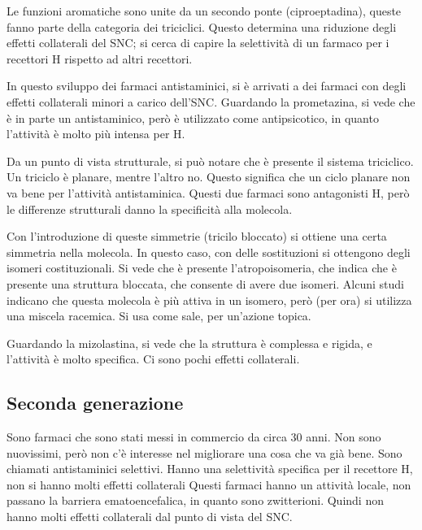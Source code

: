 
Le funzioni aromatiche sono unite da un secondo ponte (ciproeptadina),
queste fanno parte della categoria dei triciclici.
Questo determina una riduzione degli effetti collaterali del SNC; si
cerca di capire la selettività di un farmaco per i recettori H rispetto
ad altri recettori.


In questo sviluppo dei farmaci antistaminici, si è arrivati a dei
farmaci con degli effetti collaterali minori a carico dell'SNC.
Guardando la prometazina, si vede che è in parte un antistaminico, però
è utilizzato come antipsicotico, in quanto l'attività è molto più
intensa per H.

Da un punto di vista strutturale, si può notare che è presente il
sistema triciclico. Un triciclo è planare, mentre l'altro no.
Questo significa che un ciclo planare non va bene per l'attività
antistaminica.
Questi due farmaci sono antagonisti H, però le differenze strutturali
danno la specificità alla molecola.


Con l'introduzione di queste simmetrie (tricilo bloccato) si ottiene una
certa simmetria nella molecola. In questo caso, con delle sostituzioni
si ottengono degli isomeri costituzionali.
Si vede che è presente l'atropoisomeria, che indica che è presente una
struttura bloccata, che consente di avere due isomeri.
Alcuni studi indicano che questa molecola è più attiva in un isomero,
però (per ora) si utilizza una miscela racemica.
Si usa come sale, per un'azione topica.


Guardando la mizolastina, si vede che la struttura è complessa e rigida,
e l'attività è molto specifica. Ci sono pochi effetti collaterali.


\subsection{Seconda generazione}

Sono farmaci che sono stati messi in commercio da circa 30 anni. Non
sono nuovissimi, però non c'è interesse nel migliorare una cosa che va
già bene.
Sono chiamati antistaminici selettivi. Hanno una selettività specifica
per il recettore H, non si hanno molti effetti collaterali
Questi farmaci hanno un attività locale, non passano la barriera
ematoencefalica, in quanto sono zwitterioni. Quindi non hanno molti
effetti collaterali dal punto di vista del SNC.

